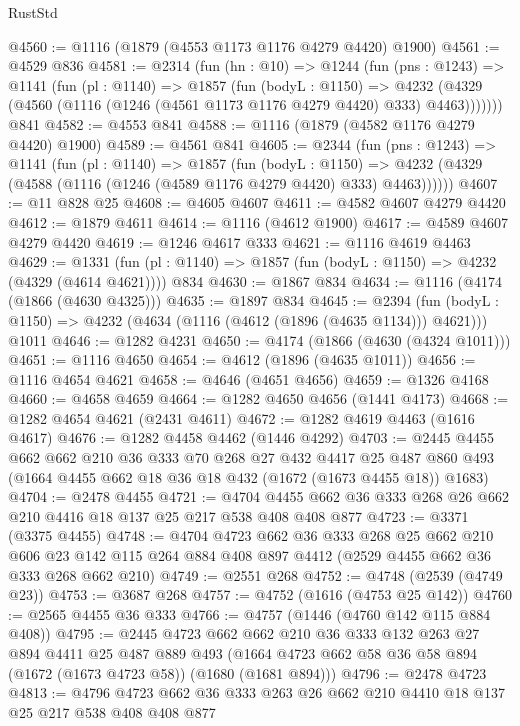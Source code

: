 \begin{lexlean}{RustStd}
\begin{coremodule}
@4560 := @1116 (@1879 (@4553 @1173 @1176 @4279 @4420) @1900)
@4561 := @4529 @836
@4581 := @2314
    (fun (hn : @10) =>
    @1244
      (fun (pns : @1243) =>
      @1141
        (fun (pl : @1140) =>
        @1857
          (fun (bodyL : @1150) =>
          @4232 (@4329 (@4560 (@1116 (@1246 (@4561 @1173 @1176 @4279 @4420) @333) @4463)))))))
    @841
@4582 := @4553 @841
@4588 := @1116 (@1879 (@4582 @1176 @4279 @4420) @1900)
@4589 := @4561 @841
@4605 := @2344
    (fun (pns : @1243) =>
    @1141
      (fun (pl : @1140) =>
      @1857
        (fun (bodyL : @1150) =>
        @4232 (@4329 (@4588 (@1116 (@1246 (@4589 @1176 @4279 @4420) @333) @4463))))))
@4607 := @11 @828 @25
@4608 := @4605 @4607
@4611 := @4582 @4607 @4279 @4420
@4612 := @1879 @4611
@4614 := @1116 (@4612 @1900)
@4617 := @4589 @4607 @4279 @4420
@4619 := @1246 @4617 @333
@4621 := @1116 @4619 @4463
@4629 := @1331 (fun (pl : @1140) => @1857 (fun (bodyL : @1150) => @4232 (@4329 (@4614 @4621)))) @834
@4630 := @1867 @834
@4634 := @1116 (@4174 (@1866 (@4630 @4325)))
@4635 := @1897 @834
@4645 := @2394
    (fun (bodyL : @1150) => @4232 (@4634 (@1116 (@4612 (@1896 (@4635 @1134))) @4621)))
    @1011
@4646 := @1282 @4231
@4650 := @4174 (@1866 (@4630 (@4324 @1011)))
@4651 := @1116 @4650
@4654 := @4612 (@1896 (@4635 @1011))
@4656 := @1116 @4654 @4621
@4658 := @4646 (@4651 @4656)
@4659 := @1326 @4168
@4660 := @4658 @4659
@4664 := @1282 @4650 @4656 (@1441 @4173)
@4668 := @1282 @4654 @4621 (@2431 @4611)
@4672 := @1282 @4619 @4463 (@1616 @4617)
@4676 := @1282 @4458 @4462 (@1446 @4292)
@4703 := @2445
    @4455
    @662
    @662
    @210
    @36
    @333
    @70
    @268
    @27
    @432
    @4417
    @25
    @487
    @860
    @493
    (@1664 @4455 @662 @18 @36 @18 @432 (@1672 (@1673 @4455 @18)) @1683)
@4704 := @2478 @4455
@4721 := @4704 @4455 @662 @36 @333 @268 @26 @662 @210 @4416 @18 @137 @25 @217 @538 @408 @408 @877
@4723 := @3371 (@3375 @4455)
@4748 := @4704
    @4723
    @662
    @36
    @333
    @268
    @25
    @662
    @210
    @606
    @23
    @142
    @115
    @264
    @884
    @408
    @897
    @4412
    (@2529 @4455 @662 @36 @333 @268 @662 @210)
@4749 := @2551 @268
@4752 := @4748 (@2539 (@4749 @23))
@4753 := @3687 @268
@4757 := @4752 (@1616 (@4753 @25 @142))
@4760 := @2565 @4455 @36 @333
@4766 := @4757 (@1446 (@4760 @142 @115 @884 @408))
@4795 := @2445
    @4723
    @662
    @662
    @210
    @36
    @333
    @132
    @263
    @27
    @894
    @4411
    @25
    @487
    @889
    @493
    (@1664 @4723 @662 @58 @36 @58 @894 (@1672 (@1673 @4723 @58)) (@1680 (@1681 @894)))
@4796 := @2478 @4723
@4813 := @4796 @4723 @662 @36 @333 @263 @26 @662 @210 @4410 @18 @137 @25 @217 @538 @408 @408 @877

\end{coremodule}
\end{lexlean}

